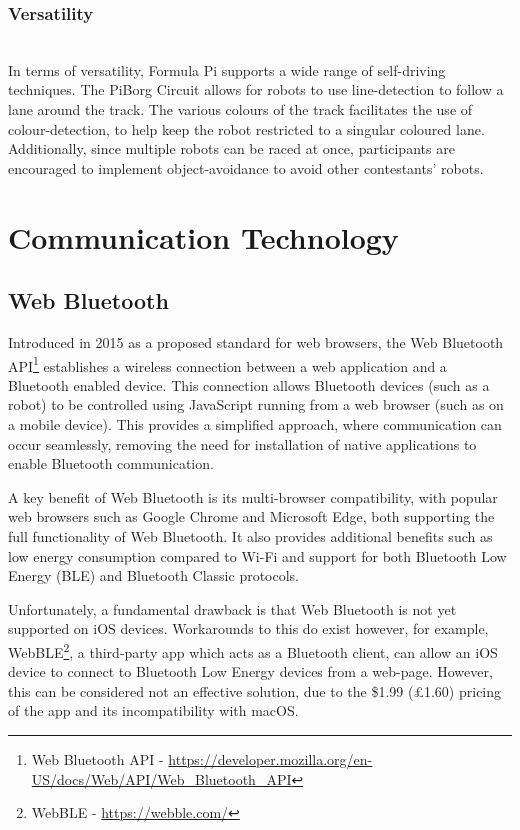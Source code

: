 \documentclass{l4proj}
\begin{document}
\subsubsection{Versatility} \hfill \\
In terms of versatility, Formula Pi supports a wide range of self-driving techniques. The PiBorg Circuit allows for robots to use line-detection to follow a lane around the track. The various colours of the track facilitates the use of colour-detection, to help keep the robot restricted to a singular coloured lane. Additionally, since multiple robots can be raced at once, participants are encouraged to implement object-avoidance to avoid other contestants' robots.


\section{Communication Technology}\label{sec:communication-tech}
\subsection{Web Bluetooth}\label{sec:bluetooth-background}
Introduced in 2015 as a proposed standard for web browsers, the Web Bluetooth API\footnote{Web Bluetooth API - \url{https://developer.mozilla.org/en-US/docs/Web/API/Web_Bluetooth_API}} establishes a wireless connection between a web application and a Bluetooth enabled device. This connection allows Bluetooth devices (such as a robot) to be controlled using JavaScript running from a web browser (such as on a mobile device). This provides a simplified approach, where communication can occur seamlessly, removing the need for installation of native applications to enable Bluetooth communication.

A key benefit of Web Bluetooth is its multi-browser compatibility, with popular web browsers such as Google Chrome and Microsoft Edge, both supporting the full functionality of Web Bluetooth. It also provides additional benefits such as low energy consumption compared to Wi-Fi and support for both Bluetooth Low Energy (BLE) and Bluetooth Classic protocols.

Unfortunately, a fundamental drawback is that Web Bluetooth is not yet supported on iOS devices. Workarounds to this do exist however, for example, WebBLE\footnote{WebBLE - \url{https://webble.com/}}, a third-party app which acts as a Bluetooth client, can allow an iOS device to connect to Bluetooth Low Energy devices from a web-page. However, this can be considered not an effective solution, due to the \$1.99 (£1.60) pricing of the app and its incompatibility with macOS.
\end{document}
